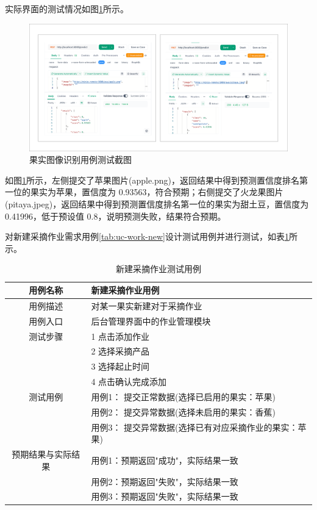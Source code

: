 实际界面的测试情况如图\ref{fig:produce-predict-apifox}所示。

\begin{figure}[H]
    \centering
    \includegraphics[width=0.8\linewidth]{../result/produce-predict-apifox.png}
    \caption{果实图像识别用例测试截图}
    \label{fig:produce-predict-apifox}
\end{figure}

如图\ref{fig:produce-predict-apifox}所示，左侧提交了苹果图片(apple.png)，返回结果中得到预测置信度排名第一位的果实为苹果，置信度为 0.93563，符合预期；右侧提交了火龙果图片(pitaya.jpeg)，返回结果中得到预测置信度排名第一位的果实为甜土豆，置信度为 0.41996，低于预设值 0.8，说明预测失败，结果符合预期。

对新建采摘作业需求用例\ref{tab:uc-work-new}设计测试用例并进行测试，如表\ref{tab:uc-work-new-test}所示。

\begin{longtable}[ht]{|c|p{8cm}|}
\caption{新建采摘作业测试用例}
\label{tab:uc-work-new-test}
\\
\hline
用例名称 & 新建采摘作业用例 \\
\hline
用例描述 & 对某一果实新建对于采摘作业 \\
\hline
用例入口 & 后台管理界面中的作业管理模块 \\
\hline
测试步骤 & 1 点击添加作业 \\
& 2 选择采摘产品 \\
& 3 选择起止时间 \\
& 4 点击确认完成添加 \\
\hline
测试用例 & 用例1： 提交正常数据(选择已启用的果实：苹果) \\
& 用例2： 提交异常数据(选择未启用的果实：香蕉) \\
\hline
& 用例3： 提交异常数据(选择已有对应采摘作业的果实：苹果) \\
\hline
预期结果与实际结果 & 用例1：预期返回"成功"，实际结果一致 \\
& 用例2：预期返回"失败"，实际结果一致 \\
& 用例3：预期返回"失败"，实际结果一致 \\
\hline
\end{longtable}


